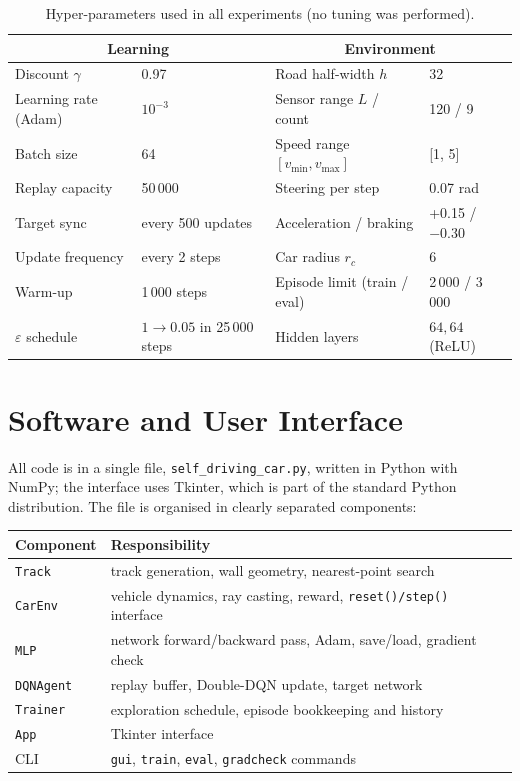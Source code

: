 \documentclass[11pt,a4paper]{article}
\newcommand{\code}[1]{\texttt{#1}}
\begin{document}
\begin{table}[H]
\centering
\caption{Hyper-parameters used in all experiments (no tuning was performed).}
{\small\setlength{\tabcolsep}{4pt}
\begin{tabular}{@{}ll@{\qquad}ll@{}}
\toprule
\multicolumn{2}{c}{\textbf{Learning}} & \multicolumn{2}{c}{\textbf{Environment}}\\
\midrule
Discount \(\gamma\) & 0.97 & Road half-width \(h\) & 32 \\
Learning rate (Adam) & \(10^{-3}\) & Sensor range \(L\) / count & 120 / 9 \\
Batch size & 64 & Speed range \([v_{\min},v_{\max}]\) & [1, 5] \\
Replay capacity & 50\,000 & Steering per step & 0.07 rad \\
Target sync & every 500 updates & Acceleration / braking & +0.15 / \(-0.30\) \\
Update frequency & every 2 steps & Car radius \(r_c\) & 6 \\
Warm-up & 1\,000 steps & Episode limit (train / eval) & 2\,000 / 3\,000 \\
\(\varepsilon\) schedule & \(1\to0.05\) in 25\,000 steps & Hidden layers & \(64,64\) (ReLU) \\
\bottomrule
\end{tabular}}
\end{table}

\section{Software and User Interface}
All code is in a single file, \code{self\_driving\_car.py}, written in Python with NumPy; the interface uses Tkinter, which is part of the standard Python distribution.
The file is organised in clearly separated components:

\begin{center}
\begin{tabular}{@{}ll@{}}
\toprule
\textbf{Component} & \textbf{Responsibility}\\
\midrule
\code{Track}    & track generation, wall geometry, nearest-point search\\
\code{CarEnv}   & vehicle dynamics, ray casting, reward, \code{reset()/step()} interface\\
\code{MLP}      & network forward/backward pass, Adam, save/load, gradient check\\
\code{DQNAgent} & replay buffer, Double-DQN update, target network\\
\code{Trainer}  & exploration schedule, episode bookkeeping and history\\
\code{App}      & Tkinter interface\\
CLI             & \code{gui}, \code{train}, \code{eval}, \code{gradcheck} commands\\
\bottomrule
\end{tabular}
\end{center}
\end{document}
